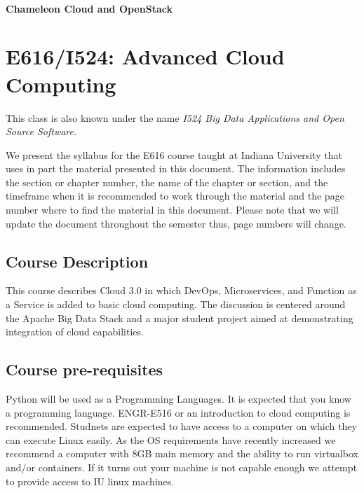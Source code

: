 \subsubsection{Chameleon Cloud and OpenStack}



\chapter{E616/I524: Advanced Cloud Computing}

This class is also known under the name \textit{I524 Big Data
Applications and Open Source Software.}
 

We present the syllabus for the E616 course taught at Indiana
University that uses in part the material presented in this
document. The information includes the section or chapter number, the
name of the chapter or section, and the timeframe when it is
recommended to work through the material and the page number where to
find the material in this document. Please note that we will update
the document throughout the semester thus, page numbers will change.

\section{Course Description }

This course describes Cloud 3.0 in which DevOps, Microservices, and
Function as a Service is added to basic cloud computing. The
discussion is centered around the Apache Big Data Stack and a major
student project aimed at demonstrating integration of cloud
capabilities.

\section{Course pre-requisites}

Python will be used as a Programming Languages. It is expected that
you know a programming language. ENGR-E516 or an introduction to cloud
computing is recommended. Studnets are expected to have access to a
computer on which they can execute Linux easily. As the OS
requirements have recently increased we recommend a computer with 8GB
main memory and the ability to run virtualbox and/or containers. If it
turns out your machine is not capable enough we attempt to provide
access to IU linux machines.

